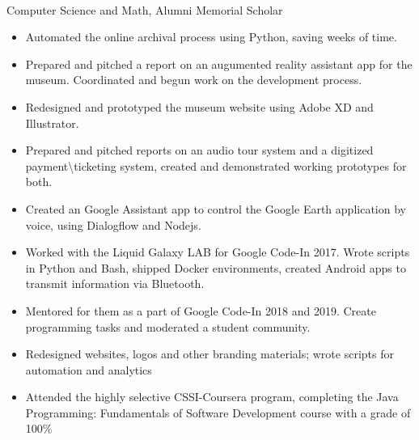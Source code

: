 \documentclass[a4paper]{resume}
\begin{document}
\vspace*{-20pt}



\vspace{20pt}

\\Computer Science and Math, Alumni Memorial Scholar
\vspace{5pt}
\enresection

\begin{itemize} \vspace{-5pt} \itemsep -2pt
	\item Automated the online archival process using Python, saving weeks of time.
	\item Prepared and pitched a report on an augumented reality assistant app for the museum. Coordinated and begun work on the development process.
	\item Redesigned and prototyped the museum website using Adobe XD and Illustrator.
	\item Prepared and pitched reports on an audio tour system and a digitized payment\textbackslash ticketing system, created and demonstrated working prototypes for both.
\end{itemize}
\enresubsection
{}
\begin{itemize} \vspace{-5pt} \itemsep -2pt
	\item Created an Google Assistant app to control the Google Earth application by voice, using Dialogflow and Nodejs.	
	\item Worked with the Liquid Galaxy LAB for Google Code-In 2017. Wrote scripts in Python and Bash, shipped Docker environments, created Android apps to transmit information via Bluetooth.
	\item Mentored for them as a part of Google Code-In 2018 and 2019. Create programming tasks and moderated a student community.
\end{itemize}
\enresubsection
{}
\begin{itemize} \vspace{-5pt} \itemsep -2pt
	\item Redesigned websites, logos and other branding materials; wrote scripts for automation and analytics
\end{itemize}
\enresubsection
{}
\begin{itemize} \vspace{-5pt} \itemsep -2pt
	\item Attended the highly selective CSSI-Coursera program, completing the Java Programming: Fundamentals of Software Development course with a grade of 100\%
\end{itemize}
\enresection
\end{document}
